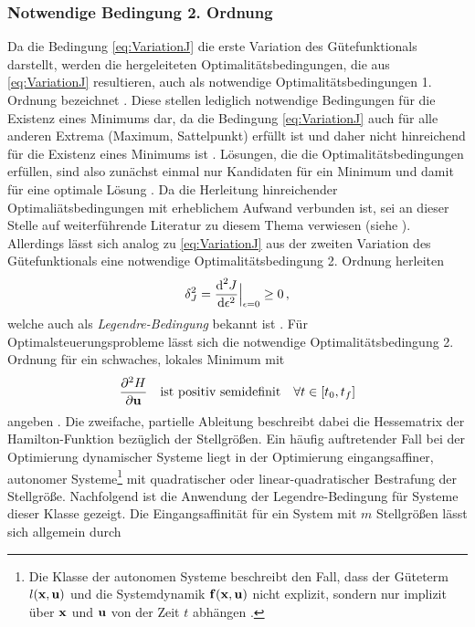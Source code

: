 \subsubsection{Notwendige Bedingung 2. Ordnung}\label{subsubsec:Legendre_Bedingung}
Da die Bedingung \eqref{eq:VariationJ} die erste Variation des Gütefunktionals darstellt, werden die hergeleiteten Optimalitätsbedingungen, die aus \eqref{eq:VariationJ} resultieren, auch als notwendige Optimalitätsbedingungen 1. Ordnung bezeichnet \cite{Papageorgiou.2012}. Diese stellen lediglich notwendige Bedingungen für die Existenz eines Minimums dar, da die Bedingung \eqref{eq:VariationJ} auch für alle anderen Extrema (Maximum, Sattelpunkt) erfüllt ist und daher nicht hinreichend für die Existenz eines Minimums ist \cite{Papageorgiou.2012}. Lösungen, die die Optimalitätsbedingungen erfüllen, sind also zunächst einmal nur Kandidaten für ein Minimum und damit für eine optimale Lösung \cite{Gerdts.2010}. Da die Herleitung hinreichender Optimaliätsbedingungen mit erheblichem Aufwand verbunden ist, sei an dieser Stelle auf weiterführende Literatur zu diesem Thema verwiesen (siehe \cite{Gerdts.2010,Maurer.1981}). Allerdings lässt sich analog zu \eqref{eq:VariationJ} aus der zweiten Variation des Gütefunktionals eine notwendige Optimalitätsbedingung 2. Ordnung herleiten
\begin{equation}
\delta^2_J = \frac{\textrm{d}^2J}{\textrm{d}{\epsilon^2}}\Big|_{\epsilon=0}\geq 0\,,
\end{equation}
welche auch als \textit{Legendre-Bedingung} bekannt ist \cite{KnutGraichen.2012}. Für Optimalsteuerungsprobleme lässt sich die notwendige Optimalitätsbedingung 2. Ordnung für ein schwaches, lokales Minimum mit 
\begin{equation}
\frac{\partial^2 H}{\partial \boldsymbol{\mathrm{u}}} \quad \textrm{ist positiv semidefinit} \quad \forall t \in[t_0,t_f]
\end{equation}
angeben \cite{KnutGraichen.2012}. Die zweifache, partielle Ableitung beschreibt dabei die Hessematrix der Hamilton-Funktion bezüglich der Stellgrößen. Ein häufig auftretender Fall bei der Optimierung dynamischer Systeme liegt in der Optimierung eingangsaffiner, autonomer Systeme\footnote{Die Klasse der autonomen Systeme beschreibt den Fall, dass der Güteterm $l(\boldsymbol{\mathrm{x}},\boldsymbol{\mathrm{u}})$ und die Systemdynamik $\boldsymbol{\mathrm{f}}(\boldsymbol{\mathrm{x}},\boldsymbol{\mathrm{u}})$ nicht explizit, sondern nur implizit über $\boldsymbol{\mathrm{x}}$ und $\boldsymbol{\mathrm{u}}$ von der Zeit $t$ abhängen \cite{KnutGraichen.2012}.} mit quadratischer oder linear-quadratischer Bestrafung der Stellgröße. Nachfolgend ist die Anwendung der Legendre-Bedingung für Systeme dieser Klasse gezeigt. Die Eingangsaffinität für ein System mit $m$ Stellgrößen lässt sich allgemein durch 

